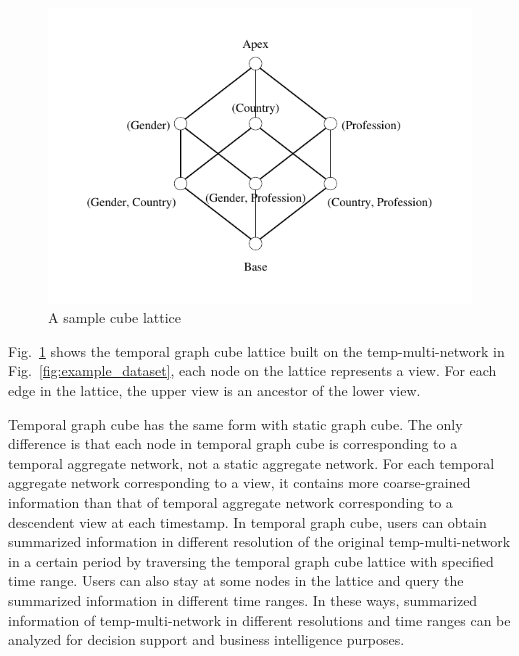 \documentclass[10pt,journal,compsoc]{IEEEtran}
\begin{document}
\begin{figure}[t]
	\begin{center}
		\includegraphics[width=0.75\columnwidth]{fig/example/cube_lattice.pdf}
	\end{center}
	\vspace*{-1cm}
	\caption{A sample cube lattice}
	\vspace*{-0.6cm}
	\label{fig:cube_lattice}
\end{figure}
\begin{example} \label{exam:cube_lattice}
	Fig.~\ref{fig:cube_lattice} shows the temporal graph cube lattice built on the temp-multi-network in Fig.~\ref{fig:example_dataset}, each node on the lattice represents a view. For each edge in the lattice, the upper view is an ancestor of the lower view.
\end{example}

Temporal graph cube has the same form with static graph cube. The only difference is that each node in temporal graph cube is corresponding to a temporal aggregate network, not a static aggregate network. For each temporal aggregate network corresponding to a view, it contains more coarse-grained information than that of temporal aggregate network corresponding to a descendent view at each timestamp. In temporal graph cube, users can obtain summarized information in different resolution of the original temp-multi-network in a certain period by traversing the temporal graph cube lattice with specified time range. Users can also stay at some nodes in the lattice and query the summarized information in different time ranges. In these ways, summarized information of temp-multi-network in different resolutions and time ranges can be analyzed for decision support and business intelligence purposes.

\end{document}
